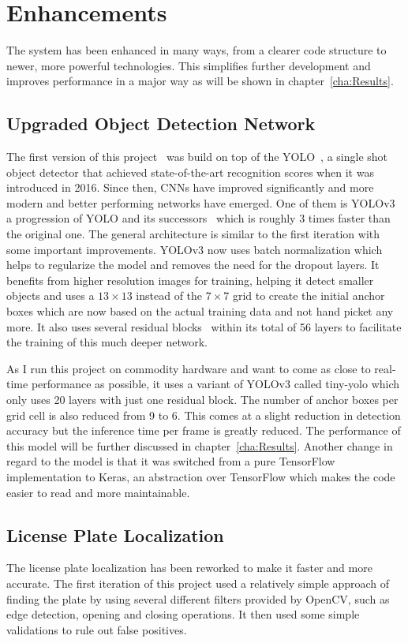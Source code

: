 \chapter{Enhancements} \label{ch:enhancements}

The system has been enhanced in many ways, from a clearer code structure to newer, more powerful technologies.
This simplifies further development and improves performance in a major way as will be shown in chapter~\ref{cha:Results}.


\section{Upgraded Object Detection Network}
The first version of this project~\cite{Berger2018} was build on top of the YOLO~\cite{Redmon}, a single shot object detector that achieved state-of-the-art recognition scores when it was introduced in 2016.
Since then, CNNs have improved significantly and more modern and better performing networks have emerged.
One of them is YOLOv3~\cite{yolov3} a progression of YOLO and its successors~\cite{Redmon2017} which is roughly 3 times faster than the original one.
The general architecture is similar to the first iteration with some important improvements.
YOLOv3 now uses batch normalization which helps to regularize the model and removes the need for the dropout layers.
It benefits from higher resolution images for training, helping it detect smaller objects and uses a $13 \times 13$ instead of the $7 \times 7$ grid to create the initial anchor boxes which are now based on the actual training data and not hand picket any more.
It also uses several residual blocks~\cite{He2016} within its total of 56 layers to facilitate the training of this much deeper network.

As I run this project on commodity hardware and want to come as close to real-time performance as possible, it uses a variant of YOLOv3 called tiny-yolo which only uses 20 layers with just one residual block.
The number of anchor boxes per grid cell is also reduced from 9 to 6.
This comes at a slight reduction in detection accuracy but the inference time per frame is greatly reduced.
The performance of this model will be further discussed in chapter~\ref{cha:Results}.
Another change in regard to the model is that it was switched from a pure TensorFlow implementation to Keras, an abstraction over TensorFlow which makes the code easier to read and more maintainable.


\section{License Plate Localization}
The license plate localization has been reworked to make it faster and more accurate.
The first iteration of this project used a relatively simple approach of finding the plate by using several different filters provided by OpenCV, such as edge detection, opening and closing operations.
It then used some simple validations to rule out false positives.

